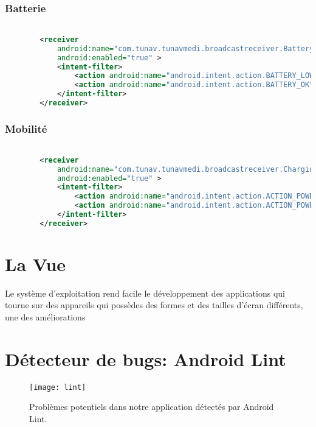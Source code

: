 \subsubsection{Batterie}

\begin{lstlisting}[language=xml, caption=Enregistrement du BatteryReceiver aux événements liée à l’état de la batterie.]

        <receiver
            android:name="com.tunav.tunavmedi.broadcastreceiver.BatteryReceiver"
            android:enabled="true" >
            <intent-filter>
                <action android:name="android.intent.action.BATTERY_LOW" />
                <action android:name="android.intent.action.BATTERY_OK" />
            </intent-filter>
        </receiver>

\end{lstlisting}



\subsubsection{Mobilité}

\begin{lstlisting}[language=xml, caption=Enregistrement du ChargingReceiver aux événements liée au status de chargement.]

        <receiver
            android:name="com.tunav.tunavmedi.broadcastreceiver.ChargingReceiver"
            android:enabled="true" >
            <intent-filter>
                <action android:name="android.intent.action.ACTION_POWER_CONNECTED" />
                <action android:name="android.intent.action.ACTION_POWER_DISCONNECTED" />
            </intent-filter>
        </receiver>

\end{lstlisting}

\section{La Vue}
Le système d'exploitation \android{} rend facile le développement des applications qui tourne sur des appareils qui possèdes des formes et des tailles d’écran différents, une des améliorations

\section{Détecteur de bugs: Android Lint}

\begin{figure}[H]
\center
\texttt{[image: lint]}
\caption{Problèmes potentiels dans notre application détectés par Android Lint.}
\label{fig:lint}
\end{figure}


